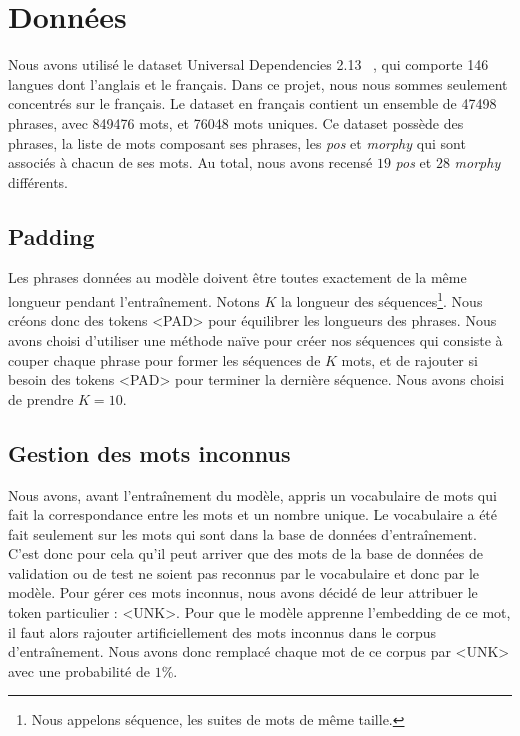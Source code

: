 \documentclass[a4paper]{article}
\begin{document}
\section{Données}

Nous avons utilisé le dataset Universal Dependencies 2.13 ~\cite{11234/1-5287}, qui comporte 146 langues dont l'anglais
et le français. Dans ce projet, nous nous sommes seulement concentrés sur le français.
Le dataset en français contient un ensemble de 47498 phrases, avec 849476 mots, et 76048 mots uniques.
Ce dataset possède des phrases, la liste de mots composant ses phrases, les \textit{pos} et \textit{morphy} qui sont associés à chacun de ses mots. Au total, nous avons recensé $19$ \textit{pos} et 
$28$ \textit{morphy} différents.

\subsection{Padding}

Les phrases données au modèle doivent être toutes exactement de la même longueur pendant l'entraînement. 
Notons $K$ la longueur des séquences\footnote{Nous appelons séquence, les suites de mots de même taille.}. Nous créons donc des 
tokens <PAD> pour équilibrer les longueurs des phrases.
Nous avons choisi d'utiliser une méthode naïve pour créer nos séquences qui consiste à couper chaque phrase pour former les séquences
de $K$ mots, et de rajouter si besoin des tokens <PAD> pour terminer la dernière séquence. Nous avons choisi de prendre $K=10$.

\subsection{Gestion des mots inconnus}

Nous avons, avant l'entraînement du modèle, appris un vocabulaire de mots qui fait la correspondance entre les mots et un nombre unique.
Le vocabulaire a été fait seulement sur les mots qui sont dans la base de données d'entraînement. C'est donc pour cela qu'il peut
arriver que des mots de la base de données de validation ou de test ne soient pas reconnus par le vocabulaire et donc par le modèle.
Pour gérer ces mots inconnus, nous avons décidé de leur attribuer le token particulier : <UNK>. Pour que le modèle
apprenne l'embedding de ce mot, il faut alors rajouter artificiellement des mots inconnus dans le corpus d'entraînement. Nous avons
donc remplacé chaque mot de ce corpus par <UNK> avec une probabilité de $1\%$.
\end{document}

